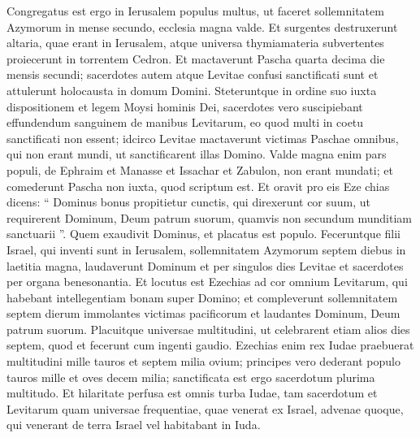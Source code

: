 \begin{biblechapter}
\begin{biblechapter}
\begin{biblechapter}
\begin{biblechapter}
\begin{biblechapter}
\begin{biblechapter}
\begin{biblechapter}
\begin{biblechapter}
\begin{biblechapter}
\begin{biblechapter}
\begin{biblechapter}
\begin{biblechapter}
\begin{biblechapter}
\begin{biblechapter}
\begin{biblechapter}
\begin{biblechapter}
\begin{biblechapter}
\begin{biblechapter}
\begin{biblechapter}
\begin{biblechapter}
\begin{biblechapter}
\begin{biblechapter}
\begin{biblechapter}
\begin{biblechapter}
\begin{biblechapter}
\begin{biblechapter}
\begin{biblechapter}
\begin{biblechapter}
\begin{biblechapter}
\begin{biblechapter}
 \verse Congregatus est ergo in Ierusalem populus multus, ut faceret sollemnitatem Azymorum in mense secundo, ecclesia magna valde. 
\verse Et surgentes destruxerunt altaria, quae erant in Ierusalem, atque universa thymiamateria subvertentes proiecerunt in torrentem Cedron.
 \verse Et mactaverunt Pascha quarta decima die mensis secundi; sacerdotes autem atque Levitae confusi sanctificati sunt et attulerunt holocausta in domum Domini. 
\verse Steteruntque in ordine suo iuxta dispositionem et legem Moysi hominis Dei, sacerdotes vero suscipiebant effundendum sanguinem de manibus Levitarum, 
\verse eo quod multi in coetu sanctificati non essent; idcirco Levitae mactaverunt victimas Paschae omnibus, qui non erant mundi, ut sanctificarent illas Domino. 
\verse Valde magna enim pars populi, de Ephraim et Manasse et Issachar et Zabulon, non erant mundati; et comederunt Pascha non iuxta, quod scriptum est. Et oravit pro eis Eze chias dicens: “ Dominus bonus propitietur 
\verse cunctis, qui direxerunt cor suum, ut requirerent Dominum, Deum patrum suorum, quamvis non secundum munditiam sanctuarii ”. 
\verse Quem exaudivit Dominus, et placatus est populo.
 \verse Feceruntque filii Israel, qui inventi sunt in Ierusalem, sollemnitatem Azymorum septem diebus in laetitia magna, laudaverunt Dominum et per singulos dies Levitae et sacerdotes per organa benesonantia. 
\verse Et locutus est Ezechias ad cor omnium Levitarum, qui habebant intellegentiam bonam super Domino; et compleverunt sollemnitatem septem dierum immolantes victimas pacificorum et laudantes Dominum, Deum patrum suorum.
 \verse Placuitque universae multitudini, ut celebrarent etiam alios dies septem, quod et fecerunt cum ingenti gaudio. 
\verse Ezechias enim rex Iudae praebuerat multitudini mille tauros et septem milia ovium; principes vero dederant populo tauros mille et oves decem milia; sanctificata est ergo sacerdotum plurima multitudo. 
\verse Et hilaritate perfusa est omnis turba Iudae, tam sacerdotum et Levitarum quam universae frequentiae, quae venerat ex Israel, advenae quoque, qui venerant de terra Israel vel habitabant in Iuda. 

\end{biblechapter}
\end{biblechapter}
\end{biblechapter}
\end{biblechapter}
\end{biblechapter}
\end{biblechapter}
\end{biblechapter}
\end{biblechapter}
\end{biblechapter}
\end{biblechapter}
\end{biblechapter}
\end{biblechapter}
\end{biblechapter}
\end{biblechapter}
\end{biblechapter}
\end{biblechapter}
\end{biblechapter}
\end{biblechapter}
\end{biblechapter}
\end{biblechapter}
\end{biblechapter}
\end{biblechapter}
\end{biblechapter}
\end{biblechapter}
\end{biblechapter}
\end{biblechapter}
\end{biblechapter}
\end{biblechapter}
\end{biblechapter}
\end{biblechapter}
